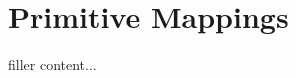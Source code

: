 \documentclass[../../templates/section]{subfiles}
\begin{document}
\section{Primitive Mappings}\label{sec:primitive-mappings}

filler content...
\end{document}
